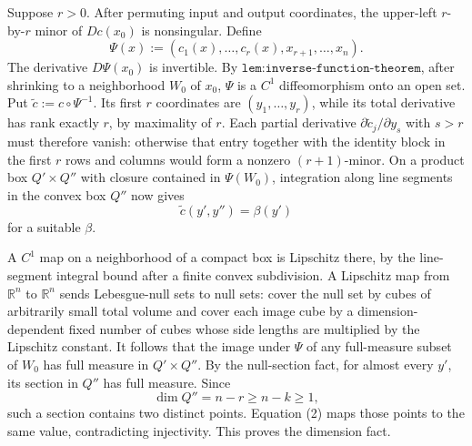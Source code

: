 Suppose \(r>0\).  After permuting input and output coordinates, the upper-left \(r\)-by-\(r\) minor of \(Dc(x_0)\) is nonsingular.  Define
\[
 \Psi(x):=(c_1(x),\ldots,c_r(x),x_{r+1},\ldots,x_n).
\]
The derivative \(D\Psi(x_0)\) is invertible.  By \(\texttt{lem:inverse-function-theorem}\), after shrinking to a neighborhood \(W_0\) of \(x_0\), \(\Psi\) is a \(C^1\) diffeomorphism onto an open set.  Put \(\widetilde c:=c\circ\Psi^{-1}\).  Its first \(r\) coordinates are \((y_1,\ldots,y_r)\), while its total derivative has rank exactly \(r\), by maximality of \(r\).  Each partial derivative \(\partial\widetilde c_j/\partial y_s\) with \(s>r\) must therefore vanish: otherwise that entry together with the identity block in the first \(r\) rows and columns would form a nonzero \((r+1)\)-minor.  On a product box \(Q'\times Q''\) with closure contained in \(\Psi(W_0)\), integration along line segments in the convex box \(Q''\) now gives
\[
 \widetilde c(y',y'')=\beta(y') \tag{2}
\]
for a suitable \(\beta\).

A \(C^1\) map on a neighborhood of a compact box is Lipschitz there, by the line-segment integral bound after a finite convex subdivision.  A Lipschitz map from \(\mathbb R^n\) to \(\mathbb R^n\) sends Lebesgue-null sets to null sets: cover the null set by cubes of arbitrarily small total volume and cover each image cube by a dimension-dependent fixed number of cubes whose side lengths are multiplied by the Lipschitz constant.  It follows that the image under \(\Psi\) of any full-measure subset of \(W_0\) has full measure in \(Q'\times Q''\).  By the null-section fact, for almost every \(y'\), its section in \(Q''\) has full measure.  Since
\[
 \dim Q''=n-r\geq n-k\geq1,
\]
such a section contains two distinct points.  Equation (2) maps those points to the same value, contradicting injectivity.  This proves the dimension fact.

